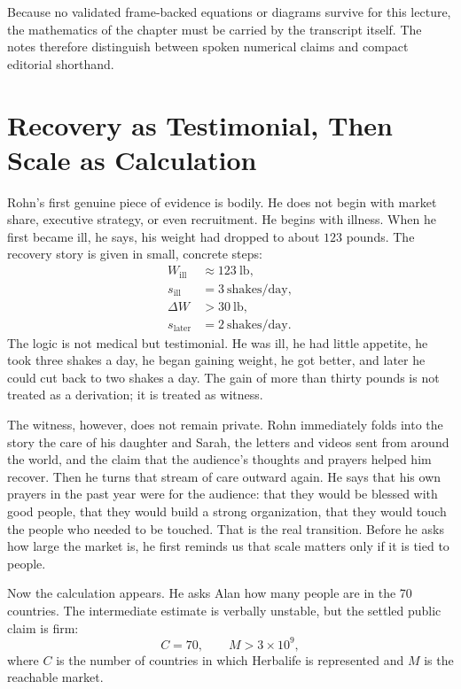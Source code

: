 \begin{remark}
Because no validated frame-backed equations or diagrams survive for this lecture, the mathematics of the chapter must be carried by the transcript itself. The notes therefore distinguish between spoken numerical claims and compact editorial shorthand.
\end{remark}

\section{Recovery as Testimonial, Then Scale as Calculation}

Rohn's first genuine piece of evidence is bodily. He does not begin with market share, executive strategy, or even recruitment. He begins with illness. When he first became ill, he says, his weight had dropped to about \(123\) pounds. The recovery story is given in small, concrete steps:
\begin{align}
W_{\text{ill}} &\approx 123\ \text{lb},\\
s_{\text{ill}} &= 3\ \text{shakes/day},\\
\Delta W &> 30\ \text{lb},\\
s_{\text{later}} &= 2\ \text{shakes/day}.
\end{align}
The logic is not medical but testimonial. He was ill, he had little appetite, he took three shakes a day, he began gaining weight, he got better, and later he could cut back to two shakes a day. The gain of more than thirty pounds is not treated as a derivation; it is treated as witness.

The witness, however, does not remain private. Rohn immediately folds into the story the care of his daughter and Sarah, the letters and videos sent from around the world, and the claim that the audience's thoughts and prayers helped him recover. Then he turns that stream of care outward again. He says that his own prayers in the past year were for the audience: that they would be blessed with good people, that they would build a strong organization, that they would touch the people who needed to be touched. That is the real transition. Before he asks how large the market is, he first reminds us that scale matters only if it is tied to people.

Now the calculation appears. He asks Alan how many people are in the 70 countries. The intermediate estimate is verbally unstable, but the settled public claim is firm:
\begin{equation}
C = 70, \qquad M > 3\times 10^9,
\end{equation}
where \(C\) is the number of countries in which Herbalife is represented and \(M\) is the reachable market.

